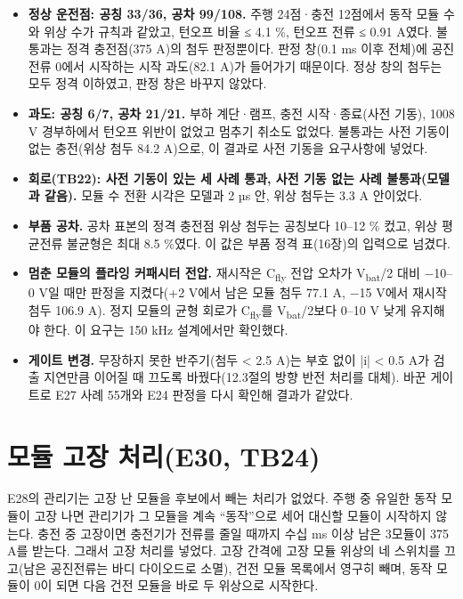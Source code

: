 \begin{itemize}
\item \textbf{정상 운전점: 공칭 33/36, 공차 99/108.} 주행 24점·충전 12점에서 동작 모듈 수와 위상 수가 규칙과 같았고, 턴오프 비율 ≤ 4.1 \%, 턴오프 전류 ≤ 0.91 A였다. 불통과는 정격 충전점(375 A)의 첨두 판정뿐이다. 판정 창(0.1 ms 이후 전체)에 공진전류 0에서 시작하는 시작 과도(82.1 A)가 들어가기 때문이다. 정상 창의 첨두는 모두 정격 이하였고, 판정 창은 바꾸지 않았다.
\item \textbf{과도: 공칭 6/7, 공차 21/21.} 부하 계단·램프, 충전 시작·종료(사전 기동), 1008 V 경부하에서 턴오프 위반이 없었고 멈추기 취소도 없었다. 불통과는 사전 기동이 없는 충전(위상 첨두 84.2 A)으로, 이 결과로 사전 기동을 요구사항에 넣었다.
\item \textbf{회로(TB22): 사전 기동이 있는 세 사례 통과, 사전 기동 없는 사례 불통과(모델과 같음).} 모듈 수 전환 시각은 모델과 2 µs 안, 위상 첨두는 3.3 A 안이었다.
\item \textbf{부품 공차.} 공차 표본의 정격 충전점 위상 첨두는 공칭보다 10–12 \% 컸고, 위상 평균전류 불균형은 최대 8.5 \%였다. 이 값은 부품 정격 표(16장)의 입력으로 넘겼다.
\item \textbf{멈춘 모듈의 플라잉 커패시터 전압.} 재시작은 C\textsubscript{fly} 전압 오차가 V\textsubscript{bat}/2 대비 −10–0 V일 때만 판정을 지켰다(+2 V에서 남은 모듈 첨두 77.1 A, −15 V에서 재시작 첨두 106.9 A). 정지 모듈의 균형 회로가 C\textsubscript{fly}를 V\textsubscript{bat}/2보다 0–10 V 낮게 유지해야 한다. 이 요구는 150 kHz 설계에서만 확인했다.
\item \textbf{게이트 변경.} 무장하지 못한 반주기(첨두 < 2.5 A)는 부호 없이 |i| < 0.5 A가 검출 지연만큼 이어질 때 끄도록 바꿨다(12.3절의 방향 반전 처리를 대체). 바꾼 게이트로 E27 사례 55개와 E24 판정을 다시 확인해 결과가 같았다.
\end{itemize}

\section{모듈 고장 처리(E30, TB24)}

E28의 관리기는 고장 난 모듈을 후보에서 빼는 처리가 없었다. 주행 중 유일한 동작 모듈이 고장 나면 관리기가 그 모듈을 계속 ``동작''으로 세어 대신할 모듈이 시작하지 않는다. 충전 중 고장이면 충전기가 전류를 줄일 때까지 수십 ms 이상 남은 3모듈이 375 A를 받는다. 그래서 고장 처리를 넣었다. 고장 간격에 고장 모듈 위상의 네 스위치를 끄고(남은 공진전류는 바디 다이오드로 소멸), 건전 모듈 목록에서 영구히 빼며, 동작 모듈이 0이 되면 다음 건전 모듈을 바로 두 위상으로 시작한다.

